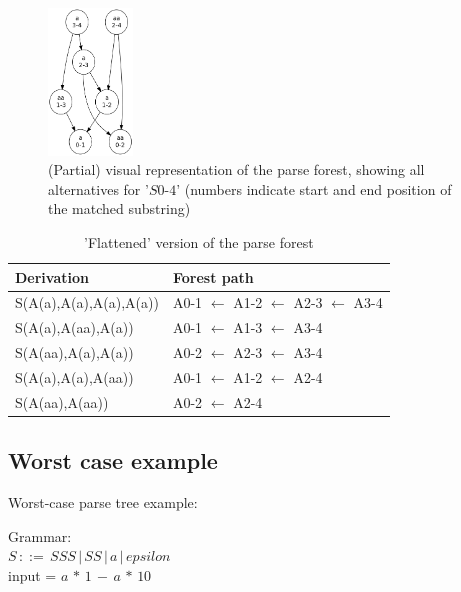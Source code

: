 \documentclass[a4paper,10pt]{article}
\begin{document}
\begin{figure}[H]
\centering
\includegraphics[width=0.2\textwidth]{a_aa-forest.png}
\caption{(Partial) visual representation of the parse forest, showing all alternatives for '$S0$-$4$' (numbers indicate start and end position of the matched substring)}
\end{figure}

\begin{table}[H]
\centering
\begin{tabular}{ p{15em} p{15em} }
Derivation & Forest path\\
\hline
S(A(a),A(a),A(a),A(a)) & A0-1 $\leftarrow$ A1-2 $\leftarrow$ A2-3 $\leftarrow$ A3-4\\
S(A(a),A(aa),A(a)) & A0-1 $\leftarrow$ A1-3 $\leftarrow$ A3-4\\
S(A(aa),A(a),A(a)) & A0-2 $\leftarrow$ A2-3 $\leftarrow$ A3-4\\
S(A(a),A(a),A(aa)) & A0-1 $\leftarrow$ A1-2 $\leftarrow$ A2-4\\
S(A(aa),A(aa)) & A0-2 $\leftarrow$ A2-4
\end{tabular}
\caption{'Flattened' version of the parse forest}
\end{table}

\subsection{Worst case example}

Worst-case parse tree example:

Grammar:\\
$S\,::=\,SSS\,|\,SS\,|\,a\,|\,epsilon$\\
input = $a\,*\,1\,-\,a\,*\,10$
\end{document}
